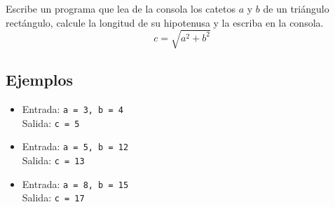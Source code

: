 Escribe un programa que lea de la consola los catetos \(a\) y \(b\) de un triángulo rectángulo, calcule la longitud de su hipotenusa y la escriba en la consola.\\
\[
c = \sqrt{a^2 + b^2}
\]
\subsection*{Ejemplos}
\begin{itemize}
    \item Entrada: \texttt{a = 3, b = 4}\\
          Salida: \texttt{c = 5}
    \item Entrada: \texttt{a = 5, b = 12}\\
          Salida: \texttt{c = 13}
    \item Entrada: \texttt{a = 8, b = 15}\\
          Salida: \texttt{c = 17}
\end{itemize}